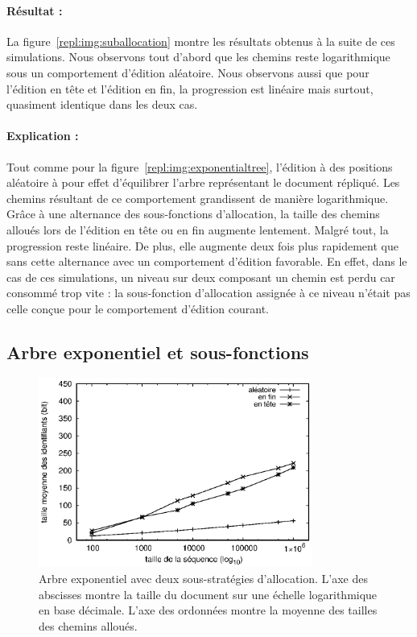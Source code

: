\paragraph{Résultat :} La figure~\ref{repl:img:suballocation} montre les
résultats obtenus à la suite de ces simulations. Nous observons tout d'abord que
les chemins reste logarithmique sous un comportement d'édition aléatoire. Nous
observons aussi que pour l'édition en tête et l'édition en fin, la progression
est linéaire mais surtout, quasiment identique dans les deux cas.

\paragraph{Explication :} Tout comme pour la
figure~\ref{repl:img:exponentialtree}, l'édition à des positions aléatoire à
pour effet d'équilibrer l'arbre représentant le document répliqué. Les chemins
résultant de ce comportement grandissent de manière logarithmique. Grâce à une
alternance des sous-fonctions d'allocation, la taille des chemins alloués lors
de l'édition en tête ou en fin augmente lentement. Malgré tout, la progression
reste linéaire. De plus, elle augmente deux fois plus rapidement que sans cette
alternance avec un comportement d'édition favorable. En effet, dans le cas de
ces simulations, un niveau sur deux composant un chemin est perdu car consommé
trop vite : la sous-fonction d'allocation assignée à ce niveau n'était pas celle
conçue pour le comportement d'édition courant.


\subsection{Arbre exponentiel et sous-fonctions}

\begin{figure}
  \begin{center}
    \includegraphics[width=0.8\textwidth]{img/lseq/lseq.eps}
    \caption{\label{repl:img:lseq} Arbre exponentiel avec deux sous-stratégies
      d'allocation. L'axe des abscisses montre la taille du document sur une
      échelle logarithmique en base décimale. L'axe des ordonnées montre la
      moyenne des tailles des chemins alloués.}
  \end{center}
\end{figure}



